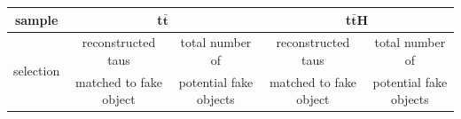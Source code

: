 \begin{table}
		\centering
                \footnotesize
                \renewcommand{\arraystretch}{1.2}
		\begin{tabular*}{\linewidth}{@{\extracolsep{\fill}}ccccc}
		\hline
		\hline
		 \textbf{sample}  & \multicolumn{2}{c}{\textbf{t$\bar{\textbf{t}}$}}  & \multicolumn{2}{c}{\textbf{t$\bar{\textbf{t}}$H}} 
		\\
		\hline
		\multirow{2}{*}{selection}  & reconstructed taus      & total number of  & reconstructed taus       & total number of
		\\
                & matched to fake object        & potential fake objects       & matched to fake object        &  potential fake objects
                \\
		\hline

\end{tabular*}
\end{table}
